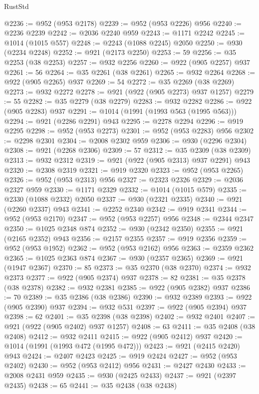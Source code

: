 \begin{lexlean}{RustStd}
\begin{coremodule}
@2236 := @952 (@953 @2178)
@2239 := @952 (@953 @2226) @956
@2240 := @2236 @2239
@2242 := @2036 @2240 @959
@2243 := @1171 @2242
@2245 := @1014 (@1015 @557)
@2248 := @2243 (@1088 @2245) @2050
@2250 := @930 (@2234 @2248)
@2252 := @921 (@2173 @2250)
@2253 := 59
@2256 := @35 @2253 (@38 @2253)
@2257 := @932 @2256
@2260 := @922 (@905 @2257) @937
@2261 := 56
@2264 := @35 @2261 (@38 @2261)
@2265 := @932 @2264
@2268 := @922 (@905 @2265) @937
@2269 := 54
@2272 := @35 @2269 (@38 @2269)
@2273 := @932 @2272
@2278 := @921 (@922 (@905 @2273) @937 @1257)
@2279 := 55
@2282 := @35 @2279 (@38 @2279)
@2283 := @932 @2282
@2286 := @922 (@905 @2283) @937
@2291 := @1014 (@1991 (@1993 @563 (@1995 @563)))
@2294 := @921 (@2286 @2291) @943
@2295 := @2278 @2294
@2296 := @919 @2295
@2298 := @952 (@953 @2273)
@2301 := @952 (@953 @2283) @956
@2302 := @2298 @2301
@2304 := @2008 @2302 @959
@2306 := @930 (@2296 @2304)
@2308 := @921 (@2268 @2306)
@2309 := 57
@2312 := @35 @2309 (@38 @2309)
@2313 := @932 @2312
@2319 := @921 (@922 (@905 @2313) @937 @2291) @943
@2320 := @2308 @2319
@2321 := @919 @2320
@2323 := @952 (@953 @2265)
@2326 := @952 (@953 @2313) @956
@2327 := @2323 @2326
@2329 := @2036 @2327 @959
@2330 := @1171 @2329
@2332 := @1014 (@1015 @579)
@2335 := @2330 (@1088 @2332) @2050
@2337 := @930 (@2321 @2335)
@2340 := @921 (@2260 @2337) @943
@2341 := @2252 @2340
@2342 := @919 @2341
@2344 := @952 (@953 @2170)
@2347 := @952 (@953 @2257) @956
@2348 := @2344 @2347
@2350 := @1025 @2348 @874
@2352 := @930 (@2342 @2350)
@2355 := @921 (@2165 @2352) @943
@2356 := @2157 @2355
@2357 := @919 @2356
@2359 := @952 (@953 @1952)
@2362 := @952 (@953 @2162) @956
@2363 := @2359 @2362
@2365 := @1025 @2363 @874
@2367 := @930 (@2357 @2365)
@2369 := @921 (@1947 @2367)
@2370 := 85
@2373 := @35 @2370 (@38 @2370)
@2374 := @932 @2373
@2377 := @922 (@905 @2374) @937
@2378 := 82
@2381 := @35 @2378 (@38 @2378)
@2382 := @932 @2381
@2385 := @922 (@905 @2382) @937
@2386 := 70
@2389 := @35 @2386 (@38 @2386)
@2390 := @932 @2389
@2393 := @922 (@905 @2390) @937
@2394 := @932 @531
@2397 := @922 (@905 @2394) @937
@2398 := 62
@2401 := @35 @2398 (@38 @2398)
@2402 := @932 @2401
@2407 := @921 (@922 (@905 @2402) @937 @1257)
@2408 := 63
@2411 := @35 @2408 (@38 @2408)
@2412 := @932 @2411
@2415 := @922 (@905 @2412) @937
@2420 := @1014 (@1991 (@1993 @472 (@1995 @472)))
@2423 := @921 (@2415 @2420) @943
@2424 := @2407 @2423
@2425 := @919 @2424
@2427 := @952 (@953 @2402)
@2430 := @952 (@953 @2412) @956
@2431 := @2427 @2430
@2433 := @2008 @2431 @959
@2435 := @930 (@2425 @2433)
@2437 := @921 (@2397 @2435)
@2438 := 65
@2441 := @35 @2438 (@38 @2438)

\end{coremodule}
\end{lexlean}

